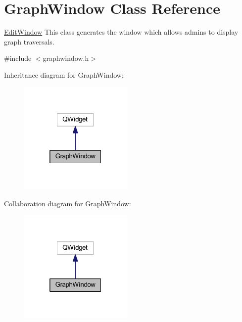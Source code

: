 \hypertarget{class_graph_window}{}\section{Graph\+Window Class Reference}
\label{class_graph_window}


\mbox{\hyperlink{class_edit_window}{Edit\+Window}} This class generates the window which allows admins to display graph traversals.  




{\ttfamily \#include $<$graphwindow.\+h$>$}



Inheritance diagram for Graph\+Window\+:\nopagebreak
\begin{figure}[H]
\begin{center}
\leavevmode
\includegraphics[width=157pt]{class_graph_window__inherit__graph}
\end{center}
\end{figure}


Collaboration diagram for Graph\+Window\+:\nopagebreak
\begin{figure}[H]
\begin{center}
\leavevmode
\includegraphics[width=157pt]{class_graph_window__coll__graph}
\end{center}
\end{figure}
